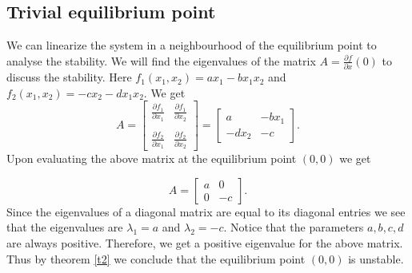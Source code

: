 \documentclass{article}
\begin{document}
\subsection{ Trivial equilibrium point}

We can linearize the system in a neighbourhood of the equilibrium point to analyse the stability. We will find the eigenvalues of the matrix $A = \frac{\partial{f}}{\partial{x}}(0)$ to discuss the stability. Here $f_1(x_1,x_2)=ax_1-bx_1x_2$ and $f_2(x_1,x_2) = -cx_2 - dx_1x_2.$
We get
\[
A = \begin{bmatrix}
    \frac{\partial{f_1}}{\partial{x_1}} & \frac{\partial{f_1}}{\partial{x_2}} \\\\
    \frac{\partial{f_2}}{\partial{x_1}} & \frac{\partial{f_2}}{\partial{x_2}}
\end{bmatrix} = \begin{bmatrix}
    a & -bx_1 \\
    -dx_2 & -c
\end{bmatrix}.
\]
Upon evaluating the above matrix at the equilibrium point $(0,0)$ we get 

\[
A =  \begin{bmatrix}
    a & 0 \\
    0 & -c
\end{bmatrix}.
\]
Since the eigenvalues of a diagonal matrix are equal to its diagonal entries we see that the eigenvalues are $\lambda_1=a$ and $\lambda_2=-c.$ Notice that the parameters $a,b,c,d$ are always positive. Therefore, we get a positive eigenvalue for the above matrix. Thus by theorem \eqref{t2} we conclude that the equilibrium point $(0,0)$ is unstable. 
\end{document}
